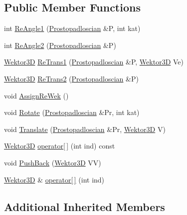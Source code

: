\subsection*{Public Member Functions}
\begin{DoxyCompactItemize}
\item 
int \hyperlink{class_prostopadloscian_ac06bcf13d7548f9787d72b88512bf013}{Re\+Angle1} (\hyperlink{class_prostopadloscian}{Prostopadloscian} \&P, int kat)
\item 
int \hyperlink{class_prostopadloscian_a13ac6e1d2da93164f16552be60055049}{Re\+Angle2} (\hyperlink{class_prostopadloscian}{Prostopadloscian} \&P)
\item 
\hyperlink{_wektor3_d_8hh_ac353a272b38b4ad342f7181ad7bdb91a}{Wektor3D} \hyperlink{class_prostopadloscian_ae7f0619842a6b21eeb7873c85f20cdf9}{Re\+Trans1} (\hyperlink{class_prostopadloscian}{Prostopadloscian} \&P, \hyperlink{_wektor3_d_8hh_ac353a272b38b4ad342f7181ad7bdb91a}{Wektor3D} Ve)
\item 
\hyperlink{_wektor3_d_8hh_ac353a272b38b4ad342f7181ad7bdb91a}{Wektor3D} \hyperlink{class_prostopadloscian_af6d4709d4c10a07a96147450ab3d29e8}{Re\+Trans2} (\hyperlink{class_prostopadloscian}{Prostopadloscian} \&P)
\item 
void \hyperlink{class_prostopadloscian_a98ee1de208d5a2ce4b40d88841498a66}{Assign\+Re\+Wek} ()
\item 
void \hyperlink{class_prostopadloscian_a3c00c5ac04367876833db20981e36a68}{Rotate} (\hyperlink{class_prostopadloscian}{Prostopadloscian} \&Pr, int kat)
\item 
void \hyperlink{class_prostopadloscian_a4b5870cc10216feaf8a23e8f9088e3ac}{Translate} (\hyperlink{class_prostopadloscian}{Prostopadloscian} \&Pr, \hyperlink{_wektor3_d_8hh_ac353a272b38b4ad342f7181ad7bdb91a}{Wektor3D} V)
\item 
\hyperlink{_wektor3_d_8hh_ac353a272b38b4ad342f7181ad7bdb91a}{Wektor3D} \hyperlink{class_prostopadloscian_af2117035517518b659795c49948c8836}{operator\mbox{[}$\,$\mbox{]}} (int ind) const
\item 
void \hyperlink{class_prostopadloscian_a42c4460d389ab1a0b62b6cf3e84abccd}{Push\+Back} (\hyperlink{_wektor3_d_8hh_ac353a272b38b4ad342f7181ad7bdb91a}{Wektor3D} VV)
\item 
\hyperlink{_wektor3_d_8hh_ac353a272b38b4ad342f7181ad7bdb91a}{Wektor3D} \& \hyperlink{class_prostopadloscian_a84dc465ece10f2fa7d60e64fc70f29c6}{operator\mbox{[}$\,$\mbox{]}} (int ind)
\end{DoxyCompactItemize}
\subsection*{Additional Inherited Members}


